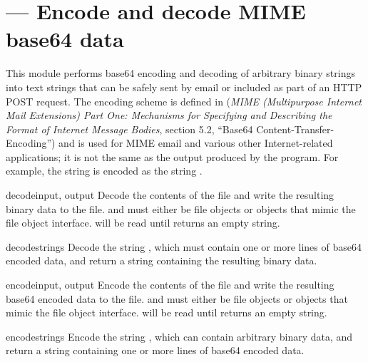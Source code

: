 \section{ ---
         Encode and decode MIME base64 data}




This module performs base64 encoding and decoding of arbitrary binary
strings into text strings that can be safely sent by email or included
as part of an HTTP POST request.  The
encoding scheme is defined in  (\emph{MIME
(Multipurpose Internet Mail Extensions) Part One: Mechanisms for
Specifying and Describing the Format of Internet Message Bodies},
section 5.2, ``Base64 Content-Transfer-Encoding'') and is used for
MIME email and various other Internet-related applications; it is not
the same as the output produced by the  program.
For example, the string  is encoded as the
string .  


\begin{funcdesc}{decode}{input, output}
Decode the contents of the  file and write the resulting
binary data to the  file.
 and  must either be file objects or objects that
mimic the file object interface.  will be read until
 returns an empty string.
\end{funcdesc}

\begin{funcdesc}{decodestring}{s}
Decode the string , which must contain one or more lines of
base64 encoded data, and return a string containing the resulting
binary data.
\end{funcdesc}

\begin{funcdesc}{encode}{input, output}
Encode the contents of the  file and write the resulting
base64 encoded data to the  file.
 and  must either be file objects or objects that
mimic the file object interface.  will be read until
 returns an empty string.
\end{funcdesc}

\begin{funcdesc}{encodestring}{s}
Encode the string , which can contain arbitrary binary data,
and return a string containing one or more lines of
base64 encoded data.
\end{funcdesc}


\begin{seealso}
\end{seealso}
